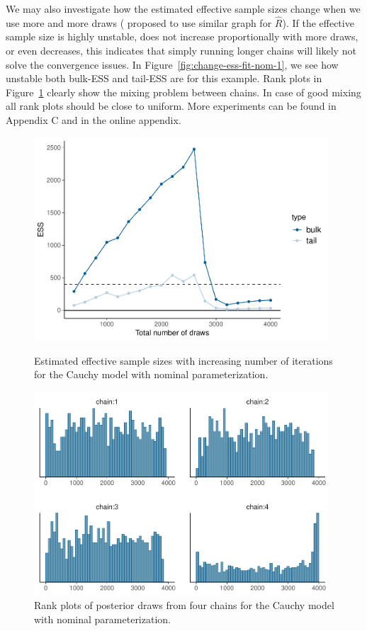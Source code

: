 \documentclass[american,]{article}
\theoremstyle{definition}
\begin{document}
We may also investigate how the estimated effective sample sizes
change when we use more and more draws (\citet{Brooks+Gelman:1998}
proposed to use similar graph for \(\widehat{R}\)). If the effective
sample size is highly unstable, does not increase proportionally with
more draws, or even decreases, this indicates that simply running
longer chains will likely not solve the convergence issues. In
Figure~\ref{fig:change-ess-fit-nom-1}, we see how unstable both
bulk-ESS and tail-ESS are for this example.
%
Rank plots in Figure~\ref{fig:hist-fit-nom-1} clearly show the
mixing problem between chains. In case of good mixing all rank plots
should be close to uniform. More experiments can be found in Appendix C 
and in the online appendix.

\begin{figure}[tp]
  \centering
  \begin{minipage}{0.48\textwidth}
  \includegraphics[width=0.98\textwidth]{graphics/change-ess-fit-nom-1.pdf}
  \caption{Estimated effective sample sizes with increasing number of iterations
  for the Cauchy model with nominal parameterization.}
  \label{fig:change-ess-fit-nom-1}
\end{minipage}
\hfill
\begin{minipage}{0.48\textwidth}
  \includegraphics[width=0.98\textwidth]{graphics/hist-fit-nom-1.pdf}
  \caption{Rank plots of posterior draws from four chains for the Cauchy model 
  with nominal parameterization.}
  \label{fig:hist-fit-nom-1}
\end{minipage}
\end{figure}
\end{document}
